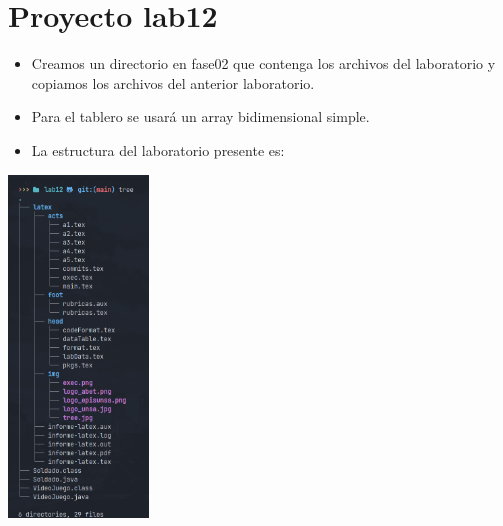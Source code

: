 \section{Proyecto lab12}
\begin{itemize}
  \item Creamos un directorio en fase02 que contenga los archivos del laboratorio y copiamos los archivos del anterior laboratorio.
  \item Para el tablero se usará un array bidimensional simple.
  \item La estructura del laboratorio presente es:
\end{itemize}
\includegraphics[width=0.28\textwidth]{img/tree.jpg}
